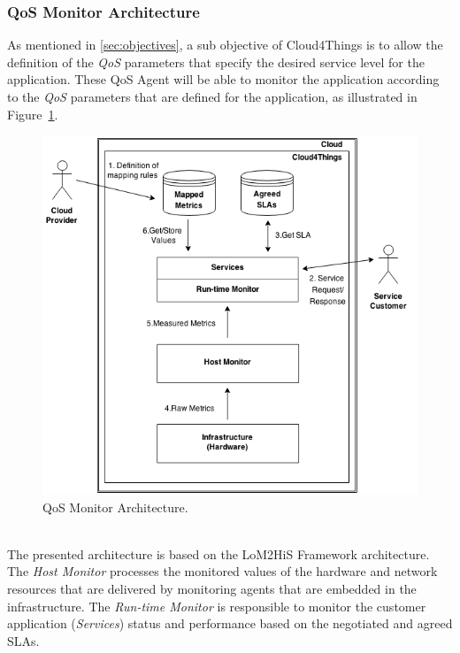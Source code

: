 \subsubsection{QoS Monitor Architecture}
\label{subs:monitoring_srchitecture}
As mentioned in \ref{sec:objectives}, a sub objective of Cloud4Things is to allow the
definition of the \textit{QoS} parameters that specify the desired service level for
the application. These QoS Agent will be able to monitor the application according to
the \textit{QoS} parameters that are defined for the application, as illustrated in
Figure~\ref{fig:monitor_architecture}.
\begin{figure}[h!]
  \centering
  \includegraphics[width=\textwidth]{./images/monitor-architecture}
  \caption{QoS Monitor Architecture.}
  \label{fig:monitor_architecture}
\end{figure}\\
The presented architecture is based on the LoM2HiS Framework \cite{emeakaroha2010low} architecture. The
\textit{Host Monitor} processes the monitored values of the hardware and network resources that are delivered
by monitoring agents that are embedded in the infrastructure. The \textit{Run-time Monitor} is responsible to
monitor the customer application (\textit{Services}) status and performance based on the negotiated
and agreed SLAs.\\

